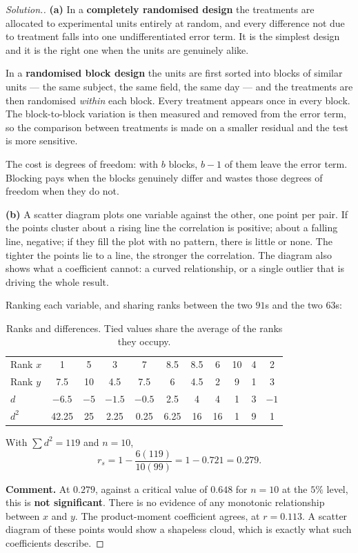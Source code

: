 \documentclass[11pt,a4paper]{article}
\theoremstyle{definition}
\newenvironment{solution}
  {\renewcommand{\qedsymbol}{}\begin{proof}[\textit{Solution}.]}
  {\end{proof}}
\begin{document}
\begin{solution}
\textbf{(a)} In a \textbf{completely randomised design} the treatments are allocated to
experimental units entirely at random, and every difference not due to treatment falls into
one undifferentiated error term. It is the simplest design and it is the right one when the
units are genuinely alike.

In a \textbf{randomised block design} the units are first sorted into blocks of similar
units --- the same subject, the same field, the same day --- and the treatments are then
randomised \emph{within} each block. Every treatment appears once in every block. The
block-to-block variation is then measured and removed from the error term, so the comparison
between treatments is made on a smaller residual and the test is more sensitive.

The cost is degrees of freedom: with $b$ blocks, $b-1$ of them leave the error term. Blocking
pays when the blocks genuinely differ and wastes those degrees of freedom when they do not.

\textbf{(b)} A scatter diagram plots one variable against the other, one point per pair. If
the points cluster about a rising line the correlation is positive; about a falling line,
negative; if they fill the plot with no pattern, there is little or none. The tighter the
points lie to a line, the stronger the correlation. The diagram also shows what a coefficient
cannot: a curved relationship, or a single outlier that is driving the whole result.

Ranking each variable, and sharing ranks between the two $91$s and the two $63$s:
\begin{table}[H]
\centering
\begin{tabular}{|l|c|c|c|c|c|c|c|c|c|c|}
\hline
Rank $x$ & 1 & 5 & 3 & 7 & 8.5 & 8.5 & 6 & 10 & 4 & 2\\
Rank $y$ & 7.5 & 10 & 4.5 & 7.5 & 6 & 4.5 & 2 & 9 & 1 & 3\\
$d$ & $-6.5$ & $-5$ & $-1.5$ & $-0.5$ & 2.5 & 4 & 4 & 1 & 3 & $-1$\\
$d^2$ & 42.25 & 25 & 2.25 & 0.25 & 6.25 & 16 & 16 & 1 & 9 & 1\\
\hline
\end{tabular}
\caption{Ranks and differences. Tied values share the average of the ranks they occupy.}
\end{table}
With $\sum d^2=119$ and $n=10$,
\[r_s=1-\frac{6(119)}{10(99)}=1-0.721=0.279.\]

\textbf{Comment.} At $0.279$, against a critical value of $0.648$ for $n=10$ at the $5\%$
level, this is \textbf{not significant}. There is no evidence of any monotonic relationship
between $x$ and $y$. The product-moment coefficient agrees, at $r=0.113$. A scatter diagram
of these points would show a shapeless cloud, which is exactly what such coefficients
describe.
\end{solution}
\end{document}
